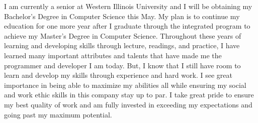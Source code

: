 \begin{cvparagraph}

I am currently a senior at Western Illinois University and I will be obtaining my Bachelor's Degree in Computer Science this May. My plan is to continue my education for one more year after I graduate through the integrated program to achieve my Master's Degree in Computer Science. Throughout these years of learning and developing skills through lecture, readings, and practice, I have learned many important attributes and talents that have made me the programmer and developer I am today. But, I know that I still have room to learn and develop my skills through experience and hard work. I see great importance in being able to maximize my abilities all while ensuring my social and work ethic skills in this company stay up to par. I take great pride to ensure my best quality of work and am fully invested in exceeding my expectations and going past my maximum potential.
\end{cvparagraph}
